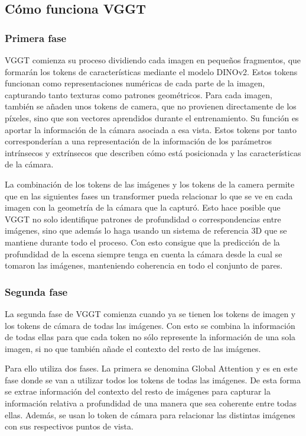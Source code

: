 \subsection{Cómo funciona VGGT}
\subsubsection{Primera fase}
VGGT comienza su proceso dividiendo cada imagen en pequeños fragmentos, que formarán los tokens de características mediante el modelo DINOv2. Estos tokens funcionan como representaciones numéricas de cada parte de la imagen, capturando tanto texturas como patrones geométricos. Para cada imagen, también se añaden unos tokens de camera, que no provienen directamente de los píxeles, sino que son vectores aprendidos durante el entrenamiento. Su función es aportar la información de la cámara asociada a esa vista. Estos tokens por tanto corresponderían a una representación de la información de los parámetros intrínsecos y extrínsecos que describen cómo está posicionada y las características de la cámara.

La combinación de los tokens de las imágenes y los tokens de la camera permite que en las siguientes fases un transformer pueda relacionar lo que se ve en cada imagen con la geometría de la cámara que la capturó. Esto hace posible que VGGT no solo identifique patrones de profundidad o correspondencias entre imágenes, sino que además lo haga usando un sistema de referencia 3D que se mantiene durante todo el proceso. Con esto consigue que la predicción de la profundidad de la escena siempre tenga en cuenta la cámara desde la cual se tomaron las imágenes, manteniendo coherencia en todo el conjunto de pares.

\subsubsection{Segunda fase}
La segunda fase de VGGT comienza cuando ya se tienen los tokens de imagen y los tokens de cámara de todas las imágenes. Con esto se combina la información de todas ellas para que cada token no sólo represente la información de una sola imagen, si no que también añade el contexto del resto de las imágenes.

Para ello utiliza dos fases. La primera se denomina Global Attention y es en este fase donde se van a utilizar todos los tokens de todas las imágenes. De esta forma se extrae información del contexto del resto de imágenes para capturar la información relativa a profundidad de una manera que sea coherente entre todas ellas. Además, se usan lo token de cámara para relacionar las distintas imágenes con sus respectivos puntos de vista.

